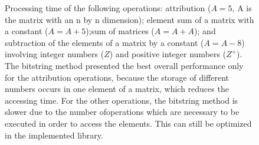 \documentclass[10pt]{article}
\begin{document}
\begin{figure}[h]
{  }
  \caption{Processing time of the following operations: attribution ($A=5$, A is the matrix with an n by n dimension); 
  element sum of a matrix with a constant ($A=A+5$);sum of matrices ($A=A+A$); and subtraction of the elements of a 
  matrix by a constant ($A=A-8$) involving integer numbers ($Z$) and positive integer numbers ($Z^+$). The bitstring 
  method presented the best overall performance only for the attribution operations, because the storage of 
  different numbers occurs in one element of a matrix, which reduces the accessing time. For the other operations, 
  the bitstring method is slower due to the number ofoperations which are necessary to be  executed in order to 
  access the elements. This can still be optimized in the implemented library.}
  \label{fig:23242526}
\end{figure}
\end{document}
